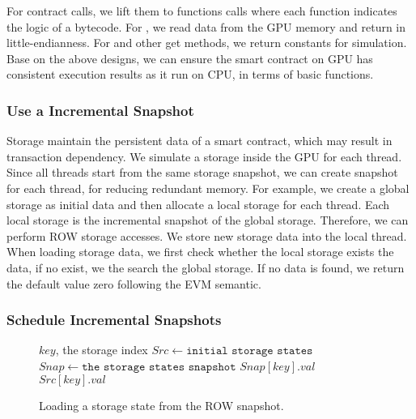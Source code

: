 For contract calls, we lift them to functions calls where each function indicates the logic of a bytecode. 
For , we read data from the GPU memory and return in little-endianness. 
For  and other get methods, we return constants for simulation. 
Base on the above designs, we can ensure the smart contract on GPU has consistent execution results as it run on CPU, in terms of basic functions.

\subsubsection{Use a Incremental Snapshot}

Storage maintain the persistent data of a smart contract, which may result in transaction dependency.
We simulate a storage inside the GPU for each thread. Since all threads start from the same storage snapshot, we can create snapshot for each thread, for reducing redundant memory. 
For example, we create a global storage as initial data and then allocate a local storage for each thread. 
Each local storage is the incremental snapshot of the global storage. Therefore, we can perform ROW storage accesses.
We store new storage data into the local thread. When loading storage data, we first check whether the local storage exists the data, if no exist, we the search the global storage. If no data is found, we return the default value zero following the EVM semantic. 

\subsubsection{Schedule Incremental Snapshots}



\begin{figure}[t]
\begin{algorithm}[H]
\caption{Loading a storage state from the ROW snapshot.}
\label{algo:row_sload}
\begin{algorithmic}[1]
    \Require $key$, the storage index
    \State $Src \gets \texttt{initial storage states}$
    \State $Snap \gets \texttt{the storage states snapshot}$
        \State \Return $Snap[key].val$
    \Else
            \State \Return $Src[key].val$
        \Else
            \State {}
        \EndIf
    \EndIf
\end{algorithmic}
\end{algorithm}
\end{figure}


